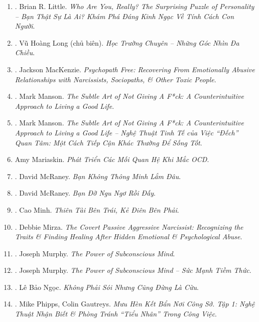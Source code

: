 \documentclass{article}
\begin{document}
\begin{enumerate}
	\item \cite{Little2023}. Brian R. Little. \textit{Who Are You, Really? The Surprising Puzzle of Personality -- Bạn Thật Sự Là Ai? Khám Phá Đáng Kinh Ngạc Về Tính Cách Con Người}.\hfill{\sf[finished]}
	\item \cite{Long2021}. Vũ Hoàng Long (chủ biên). \textit{Học Trường Chuyên -- Những Góc Nhìn Đa Chiều}.\hfill{\sf[finished]}
	\item \cite{MacKenzie2015}. Jackson MacKenzie. \textit{Psychopath Free: Recovering From Emotionally Abusive Relationships with Narcissists, Sociopaths, \& Other Toxic People}.\hfill{\sf[finished]}
	\item \cite{Manson_giving_fuck}. Mark Manson. \textit{The Subtle Art of Not Giving A F*ck: A Counterintuitive Approach to Living a Good Life}.\hfill{\sf[reading]}
	\item \cite{Manson_giving_fuck_vn}. Mark Manson. \textit{The Subtle Art of Not Giving A F*ck: A Counterintuitive Approach to Living a Good Life -- Nghệ Thuật Tinh Tế của Việc ``Đếch'' Quan Tâm: Một Cách Tiếp Cận Khác Thường Để Sống Tốt}.\hfill{\sf[finished]}
	\item Amy Mariaskin. \textit{Phát Triển Các Mối Quan Hệ Khi Mắc OCD}.
	\item \cite{McRaney2022a}. David McRaney. \textit{Bạn Không Thông Minh Lắm Đâu}.\hfill{\sf[finished]}
	\item \cite{McRaney2022b}. David McRaney. \textit{Bạn Đỡ Ngu Ngơ Rồi Đấy}.\hfill{\sf[finished]}
	\item \cite{Minh2022}. Cao Minh. \textit{Thiên Tài Bên Trái, Kẻ Điên Bên Phải}.\hfill{\sf[finished]}
	\item \cite{Mirza2017}. Debbie Mirza. \textit{The Covert Passive Aggressive Narcissist: Recognizing the Traits \& Finding Healing After Hidden Emotional \& Psychological Abuse}.\hfill{\sf[finished]}
	\item \cite{Murphy2011}. Joseph Murphy. \textit{The Power of Subconscious Mind}.\hfill{\sf[reading]}
	\item \cite{Murphy2021}. Joseph Murphy. \textit{The Power of Subconscious Mind -- Sức Mạnh Tiềm Thức}.\hfill{\sf[finished]}
	\item \cite{Ngoc2022}. Lê Bảo Ngọc. \textit{Không Phải Sói Nhưng Cũng Đừng Là Cừu}.\hfill{\sf[finished]}
	\item \cite{Phipps_Gautreys_muu_hen_ke_ban_tap_1}. Mike Phipps, Colin Gautreys. \textit{Mưu Hèn Kết Bẩn Nơi Công Sở. Tập 1: Nghệ Thuật Nhận Biết \& Phòng Tránh ``Tiểu Nhân'' Trong Công Việc}.\hfill{\sf[finished]}

\end{enumerate}
\end{document}
